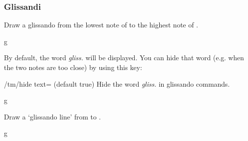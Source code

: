 \subsubsection{Glissandi}\label{sec:inline:arpeggio-glissando:glissando}
\begin{command}{\tmglissando{}}
  Draw a glissando from the lowest note of  to the highest note of 
  .
\end{command}
\begin{codeexample}[]
\begin{tmline}
\begin{tmstaff}{g}{}
\end{tmstaff}
\end{tmline}
\end{codeexample}
By default, the word \emph{gliss.} will be displayed. You can hide that word 
(e.g. when the two notes are too close) by using this key:
\begin{key}{/tm/hide text= (default true)}
  Hide the word \emph{gliss.} in glissando commands.
\end{key}
\begin{codeexample}[]
\begin{tmline}
\begin{tmstaff}{g}{}
\end{tmstaff}
\end{tmline}
\end{codeexample}
\begin{command}{\tmglissandocoordinate{}}
  Draw a `glissando line' from  to .
\end{command}
\begin{codeexample}[]
\begin{tmline}
\begin{tmstaff}{g}{}
\end{tmstaff}
\end{tmline}
\end{codeexample}
